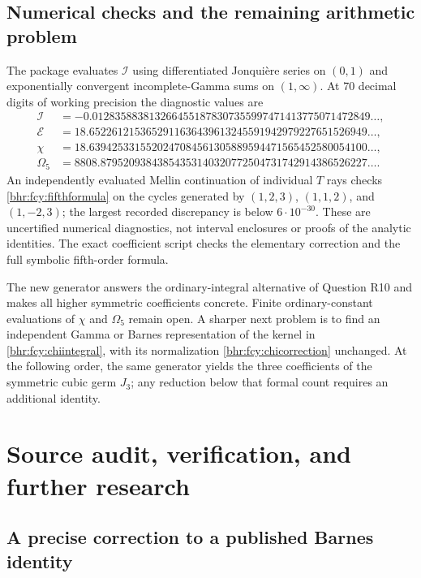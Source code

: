 \documentclass[11pt]{article}
\numberwithin{equation}{section}
\theoremstyle{plain}
\theoremstyle{definition}
\theoremstyle{remark}
\begin{document}
\subsection{Numerical checks and the remaining arithmetic problem}
The package evaluates \(\mathcal I\) using differentiated
Jonqui\`ere series on \((0,1)\) and exponentially convergent
incomplete-Gamma sums on \((1,\infty)\). At 70 decimal digits
of working precision the diagnostic values are
\begin{align*}
 \mathcal I&=-0.0128358838132664551878307355997471413775071472849\ldots,\\
 \mathcal E&=18.6522612153652911636439613245591942979227651526949\ldots,\\
 \chi&=18.6394253315520247084561305889594471565452580054100\ldots,\\
 \Omega_5&=8808.87952093843854353140320772504731742914386526227\ldots.
\end{align*}
An independently evaluated Mellin continuation of individual
\(T\) rays checks \eqref{bhr:fcy:fifthformula} on the cycles generated
by \((1,2,3)\), \((1,1,2)\), and \((1,-2,3)\); the largest
recorded discrepancy is below \(6\cdot10^{-30}\). These are
uncertified numerical diagnostics, not interval enclosures or
proofs of the analytic identities. The exact coefficient script
checks the elementary correction and the full symbolic fifth-order
formula.

The new generator answers the ordinary-integral alternative of
Question R10 and makes all higher symmetric coefficients concrete.
Finite ordinary-constant evaluations of \(\chi\) and
\(\Omega_5\) remain open. A sharper next problem is to find an
independent Gamma or Barnes representation of the kernel in
\eqref{bhr:fcy:chiintegral}, with its normalization \eqref{bhr:fcy:chicorrection}
unchanged. At the following order, the same generator yields the
three coefficients of the symmetric cubic germ \(J_3\); any
reduction below that formal count requires an additional identity.



\section{Source audit, verification, and further research}
\label{bhr:sec:audit}

\subsection{A precise correction to a published Barnes identity}
\end{document}
